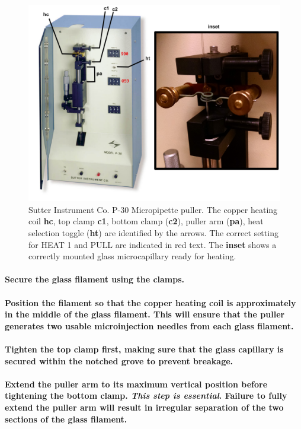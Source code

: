 \documentclass[11pt]{article}
\begin{document}
\begin{figure}
\centering
\includegraphics[width=0.6\linewidth]{./img/figure2.pdf}
\caption{Sutter Instrument Co. P-30 Micropipette puller. The copper heating coil \textbf{hc}, top clamp \textbf{c1}, bottom clamp (\textbf{c2}), puller arm (\textbf{pa}), heat selection toggle (\textbf{ht}) are identified by the arrows. The correct setting for HEAT 1 and PULL are indicated in red text. The \textbf{inset} shows a correctly mounted glass microcapillary ready for heating.}
\end{figure}

\paragraph{{\bfseries\sffamily } Secure the glass filament using the clamps.}
\label{sec:orgheadline22}
\paragraph{{\bfseries\sffamily } Position the filament so that the copper heating coil is approximately in the middle of the glass filament. This will ensure that the puller generates two usable microinjection needles from each glass filament.}
\label{sec:orgheadline23}
\paragraph{{\bfseries\sffamily } Tighten the top clamp first, making sure that the glass capillary is secured within the notched grove to prevent breakage.}
\label{sec:orgheadline24}
\paragraph{{\bfseries\sffamily } Extend the puller arm to its maximum vertical position before tightening the bottom clamp. \textbf{\emph{This step is essential}}. Failure to fully extend the puller arm will result in irregular separation of the two sections of the glass filament.}
\label{sec:orgheadline25}
\end{document}
